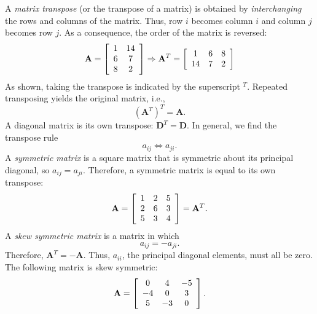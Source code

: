    A \emph{matrix transpose} (or the transpose of a matrix) is obtained by \emph{interchanging} the rows and columns 
of the matrix. Thus, row $i$ becomes column $i$ and column $j$ becomes row $j$. As a consequence, the order of the matrix 
is reversed:
\begin{equation}
	\index{Matrix!transpose}
	\index{Transpose of matrix}
\mathbf{A} = \left[     \begin{array}{cc}
1 & 14 \\
6 & 7 \\
8 & 2 
\end{array} \right]
 \Rightarrow
\mathbf{A}^T = \left[ \begin{array}{ccr}
1 & 6 & 8 \\
14 & 7 & 2 \end{array} \right]
\end{equation}
As shown, taking the transpose is indicated by the superscript $^T$.
Repeated transposing yields the original matrix, i.e.,
\begin{equation}
(\mathbf{A}^T)^T = \mathbf{A}.
\end{equation} 
A diagonal matrix is its own transpose: $\mathbf{D}^T = \mathbf{D}$. In general, we find the transpose rule
\begin{equation}
a_{ij} \Leftrightarrow a_{ji}.
\end{equation}	 
   A \emph{symmetric matrix} is a square matrix that is symmetric about its principal diagonal, so 
$a_{ij} = a_{ji}$.  Therefore, a symmetric matrix is equal to its own transpose:
\begin{equation}
	\index{Matrix!symmetric}
	\index{Symmetric matrix}
\mathbf{A} = \left[ \begin{array}{ccc} 
1 & 2 & 5 \\
2 & 6 & 3 \\
5 & 3 & 4
\end{array}
\right]
= \mathbf{A}^T .
\end{equation} 	 
A \emph{skew symmetric matrix} is a matrix in which
\begin{equation}
a_{ij} = -a_{ji}.
\end{equation}
Therefore, $\mathbf{A}^T = - \mathbf{A}$.  Thus, $a_{ii}$, the principal diagonal elements, must all be zero.
The following matrix is skew symmetric:
\begin{equation}
	\index{Matrix!skew symmetric}
	\index{Skew symmetric matrix}
\mathbf{A} = \left[ \begin{array}{ccc} 
0 & 4 & -5 \\
-4 & 0 & 3 \\
5 & -3 & 0
\end{array}
\right].
\end{equation}
